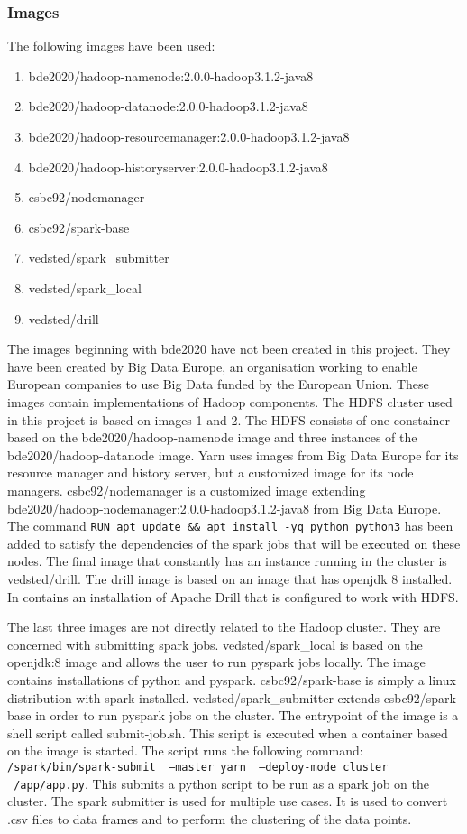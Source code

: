 \documentclass[main.tex]{subfiles}
\begin{document}
\subsubsection{Images}
The following images have been used:
\begin{enumerate}
    \item bde2020/hadoop-namenode:2.0.0-hadoop3.1.2-java8
    \item bde2020/hadoop-datanode:2.0.0-hadoop3.1.2-java8
    \item bde2020/hadoop-resourcemanager:2.0.0-hadoop3.1.2-java8
    \item bde2020/hadoop-historyserver:2.0.0-hadoop3.1.2-java8
    \item csbc92/nodemanager
    \item csbc92/spark-base
    \item vedsted/spark\_submitter
    \item vedsted/spark\_local
    \item vedsted/drill
\end{enumerate}
 
The images beginning with bde2020 have not been created in this project. They have been created by Big Data Europe, an organisation working to enable European companies to use Big Data funded by the European Union. These images contain implementations of Hadoop components. The HDFS cluster used in this project is based on images 1 and 2. The HDFS consists of one constainer based on the bde2020/hadoop-namenode image and three instances of the bde2020/hadoop-datanode image. Yarn uses images from Big Data Europe for its resource manager and history server, but a customized image for its node managers. csbc92/nodemanager is a customized image extending bde2020/hadoop-nodemanager:2.0.0-hadoop3.1.2-java8 from Big Data Europe. The command \texttt{RUN apt update \&\& apt install -yq python python3} has been added to satisfy the dependencies of the spark jobs that will be executed on these nodes. The final image that constantly has an instance running in the cluster is vedsted/drill. The drill image is based on an image that has openjdk 8 installed. In contains an installation of Apache Drill that is configured to work with HDFS. 

The last three images are not directly related to the Hadoop cluster. They are concerned with submitting spark jobs. vedsted/spark\_local is based on the openjdk:8 image and allows the user to run pyspark jobs locally. The image contains installations of python and pyspark.
csbc92/spark-base is simply a linux distribution with spark installed. vedsted/spark\_submitter extends csbc92/spark-base in order to run pyspark jobs on the cluster. The entrypoint of the image is a shell script called submit-job.sh. This script is executed when a container based on the image is started. The script runs the following command: \texttt{/spark/bin/spark-submit \
--master yarn \
--deploy-mode cluster \
/app/app.py}. This submits a python script to be run as a spark job on the cluster. The spark submitter is used for multiple use cases. It is used to convert .csv files to data frames and to perform the clustering of the data points.
\end{document}
